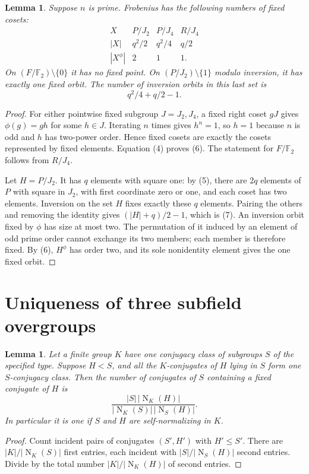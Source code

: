 \documentclass[11pt,a4paper]{article}
\newtheorem{lemma}[theorem]{Lemma}
\newcommand{\F}{\mathbb F}
\newcommand{\N}{\operatorname{N}}
\begin{document}
\begin{lemma}\label{fixed}
Suppose $n$ is prime. Frobenius has the following numbers of fixed
cosets:
\[
\begin{array}{c|ccc}
 X&P/J_2&P/J_4&R/J_4\\\hline
 |X|&q^2/2&q^2/4&q/2\\
 |X^\phi|&2&1&1.
\end{array}                                               \tag{6}
\]
On $(F/\F_2)\setminus\{0\}$ it has no fixed point. On
$(P/J_2)\setminus\{1\}$ modulo inversion, it has exactly one
fixed orbit. The number of inversion orbits in this last set is
\[
                         q^2/4+q/2-1.                  \tag{7}
\]
\end{lemma}
\begin{proof}
For either pointwise fixed subgroup $J=J_2,J_4$, a fixed right
coset $gJ$ gives $\phi(g)=gh$ for some $h\in J$.
Iterating $n$ times gives $h^n=1$, so $h=1$ because $n$ is odd
and $h$ has two-power order. Hence fixed cosets are exactly the
cosets represented by fixed elements. Equation (4) proves (6).
The statement for $F/\F_2$ follows from $R/J_4$.

Let $H=P/J_2$. It has $q$ elements with square one: by (5),
there are $2q$ elements of $P$ with square in $J_2$, with first
coordinate zero or one, and each coset has two elements.
Inversion on the set $H$ fixes exactly these $q$ elements.
Pairing the others and removing the identity gives
$(|H|+q)/2-1$, which is (7). An inversion orbit fixed by
$\phi$ has size at most two. The permutation of it induced by
an element of odd prime order cannot exchange its two members;
each member is therefore fixed. By (6), $H^\phi$ has order two,
and its sole nonidentity element gives the one fixed orbit.
\end{proof}

\section{Uniqueness of three subfield overgroups}
\begin{lemma}\label{incidence}
Let a finite group $K$ have one conjugacy class of subgroups $S$
of the specified type. Suppose $H<S$, and all the $K$-conjugates
of $H$ lying in $S$ form one $S$-conjugacy class. Then the number of
conjugates of $S$ containing a fixed conjugate of $H$ is
\[
 \frac{|S|\,|\N_K(H)|}{|\N_K(S)|\,|\N_S(H)|}.
                                                        \tag{8}
\]
In particular it is one if $S$ and $H$ are self-normalizing in
$K$.
\end{lemma}
\begin{proof}
Count incident pairs of conjugates $(S',H')$ with $H'\le S'$.
There are $|K|/|\N_K(S)|$ first entries, each incident with
$|S|/|\N_S(H)|$ second entries. Divide by the total number
$|K|/|\N_K(H)|$ of second entries.
\end{proof}
\end{document}
